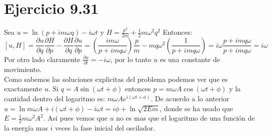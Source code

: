 \documentclass[letterpaper,10pt]{article}
\begin{document}
\section*{Ejercicio 9.31}
Sea $u=\ln (p+i m \omega q)-i \omega t$ y $H=\frac{p^2}{2 m}+\frac{1}{2} m
   \omega^2 q^2 $
Entonces:
$$[u,H]=\frac{\partial u}{\partial q}\frac{\partial H}{\partial p}-\frac{\partial H}{\partial q}\frac{\partial u}{\partial p}=\left( \frac{i m \omega }{p+i m q
   \omega } \right)\frac{p}{m}-m q \omega ^2 \left( \frac{1}{p+i m q \omega }\right)=i \omega \frac{p+i m q \omega }{p+i m q \omega }=i\omega$$
Por otro lado claramente $\frac{\partial u}{\partial t}=-i \omega$, por lo tanto $u$ es una constante de movimiento.\\
Como sabemos las soluciones explicitas del problema podemos ver que es exactamente $u$. Si $q=A \sin (\omega t+\phi)$ entonces $p=m \omega A \cos( \omega t+\phi)$ y la cantidad dentro del logaritmo es: $m \omega A e^{i (\omega t +\phi)}$. De acuerdo a lo anterior $u=\ln m \omega A+i (\omega t +\phi)-i \omega t=i\phi+\ln \sqrt{2 E m}$, donde se ha usado que $E=\frac{1}{2} m \omega^2 A^2$. Asi pues vemos que $u$ no es mas que el logaritmo de una funci\'on de la energ\'ia mas $i$ veces la fase inicial del oscilador.
\end{document}
